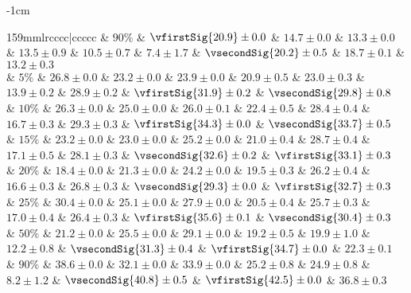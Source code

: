 \begin{table}[tbh]
\begin{adjustwidth}{-1cm}{}
\begin{tabulary}{159mm}{lrcccc|ccccc}
                                                  & $90\%$ &  $\vfirstSig{20.9} \pm 0.0$  &              $14.7 \pm 0.0$  &              $13.3 \pm 0.0$  &  $13.5 \pm 0.9$  &              $10.5 \pm 0.7$  &  $7.4 \pm 1.7$  &  $\vsecondSig{20.2} \pm 0.5$  &               $18.7 \pm 0.1$  &  $13.2 \pm 0.3$  \\
\midrule
{} & $5\%$  &  $26.8 \pm 0.0$  &  $23.2 \pm 0.0$  &  $23.9 \pm 0.0$  &  $20.9 \pm 0.5$  &  $23.0 \pm 0.3$  &  $13.9 \pm 0.2$  &               $28.9 \pm 0.2$  &   $\vfirstSig{31.9} \pm 0.2$  &  $\vsecondSig{29.8} \pm 0.8$  \\
                                                  & $10\%$ &  $26.3 \pm 0.0$  &  $25.0 \pm 0.0$  &  $26.0 \pm 0.1$  &  $22.4 \pm 0.5$  &  $28.4 \pm 0.4$  &  $16.7 \pm 0.3$  &               $29.3 \pm 0.3$  &   $\vfirstSig{34.3} \pm 0.0$  &  $\vsecondSig{33.7} \pm 0.5$  \\
                                                  & $15\%$ &  $23.2 \pm 0.0$  &  $23.0 \pm 0.0$  &  $25.2 \pm 0.0$  &  $21.0 \pm 0.4$  &  $28.7 \pm 0.4$  &  $17.1 \pm 0.5$  &               $28.1 \pm 0.3$  &  $\vsecondSig{32.6} \pm 0.2$  &   $\vfirstSig{33.1} \pm 0.3$  \\
                                                  & $20\%$ &  $18.4 \pm 0.0$  &  $21.3 \pm 0.0$  &  $24.2 \pm 0.0$  &  $19.5 \pm 0.3$  &  $26.2 \pm 0.4$  &  $16.6 \pm 0.3$  &               $26.8 \pm 0.3$  &  $\vsecondSig{29.3} \pm 0.0$  &   $\vfirstSig{32.7} \pm 0.3$  \\
                                                  & $25\%$ &  $30.4 \pm 0.0$  &  $25.1 \pm 0.0$  &  $27.9 \pm 0.0$  &  $20.5 \pm 0.4$  &  $25.7 \pm 0.3$  &  $17.0 \pm 0.4$  &               $26.4 \pm 0.3$  &   $\vfirstSig{35.6} \pm 0.1$  &  $\vsecondSig{30.4} \pm 0.3$  \\
                                                  & $50\%$ &  $21.2 \pm 0.0$  &  $25.5 \pm 0.0$  &  $29.1 \pm 0.0$  &  $19.2 \pm 0.5$  &  $19.9 \pm 1.0$  &  $12.2 \pm 0.8$  &  $\vsecondSig{31.3} \pm 0.4$  &   $\vfirstSig{34.7} \pm 0.0$  &               $22.3 \pm 0.1$  \\
                                                  & $90\%$ &  $38.6 \pm 0.0$  &  $32.1 \pm 0.0$  &  $33.9 \pm 0.0$  &  $25.2 \pm 0.8$  &  $24.9 \pm 0.8$  &   $8.2 \pm 1.2$  &  $\vsecondSig{40.8} \pm 0.5$  &   $\vfirstSig{42.5} \pm 0.0$  &               $36.8 \pm 0.3$  \\

\end{tabulary}
\end{adjustwidth}
\end{table}
